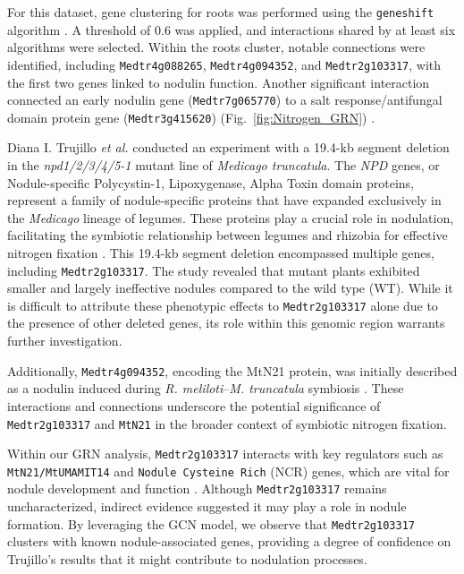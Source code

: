 \documentclass{article}
\newcounter{subsubsubsection}[subsubsection]
\begin{document}
For this dataset, gene clustering for roots was performed using the \texttt{geneshift} algorithm \cite{medicago}. A threshold of 0.6 was applied, and interactions shared by at least six algorithms were selected. Within the roots cluster, notable connections were identified, including \texttt{Medtr4g088265}, \texttt{Medtr4g094352}, and \texttt{Medtr2g103317}, with the first two genes linked to nodulin function. Another significant interaction connected an early nodulin gene (\texttt{Medtr7g065770}) to a salt response/antifungal domain protein gene (\texttt{Medtr3g415620}) (Fig.~\ref{fig:Nitrogen_GRN}) \cite{boschiero2020mtsspdb}.

Diana I. Trujillo \textit{et al.} \cite{trujillo2019nodule} conducted an experiment with a 19.4-kb segment deletion in the \textit{npd1/2/3/4/5-1} mutant line of \textit{Medicago truncatula}. The \textit{NPD} genes, or Nodule-specific Polycystin-1, Lipoxygenase, Alpha Toxin domain proteins, represent a family of nodule-specific proteins that have expanded exclusively in the \textit{Medicago} lineage of legumes. These proteins play a crucial role in nodulation, facilitating the symbiotic relationship between legumes and rhizobia for effective nitrogen fixation \cite{pislariu2019npd1}. This 19.4-kb segment deletion encompassed multiple genes, including \texttt{Medtr2g103317}. The study revealed that mutant plants exhibited smaller and largely ineffective nodules compared to the wild type (WT). While it is difficult to attribute these phenotypic effects to \texttt{Medtr2g103317} alone due to the presence of other deleted genes, its role within this genomic region warrants further investigation. 

Additionally, \texttt{Medtr4g094352}, encoding the MtN21 protein, was initially described as a nodulin induced during \textit{R. meliloti}–\textit{M. truncatula} symbiosis \cite{gamas1996subtractive}. These interactions and connections underscore the potential significance of \texttt{Medtr2g103317} and \texttt{MtN21} in the broader context of symbiotic nitrogen fixation.

Within our GRN analysis, \texttt{Medtr2g103317} interacts with key regulators such as \texttt{MtN21/MtUMAMIT14} and \texttt{Nodule Cysteine Rich} (NCR) genes, which are vital for nodule development and function \cite{boschiero2020mtsspdb}. Although \texttt{Medtr2g103317} remains uncharacterized, indirect evidence suggested it may play a role in nodule formation. By leveraging the GCN model, we observe that \texttt{Medtr2g103317} clusters with known nodule-associated genes, providing a degree of confidence on Trujillo's results that it might contribute to nodulation processes.
\end{document}
